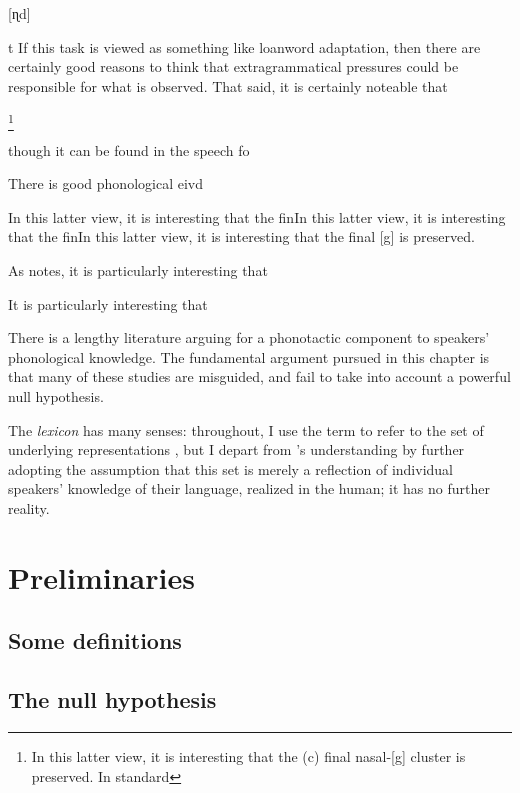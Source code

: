 
[ɳd]

t
If this task is viewed as something like loanword adaptation, then there are certainly good reasons to think that extragrammatical pressures \citep{Halle1998b,Dupoux1999,Ussishkin2003,Peperkamp2008} could be responsible for what is observed. That said, it is certainly noteable that 

\footnote{In this latter view, it is interesting that the (\lastx c) final nasal-[g] cluster is preserved. In standard }

\citep{Schleef2011}


though it can be found in the speech fo 

There is good phonological eivd

In this latter view, it is interesting that the finIn this latter view, it is interesting that the finIn this latter view, it is interesting that the final [g] is preserved.

As \citeauthor{Wright1975} notes, it is particularly interesting that 

It is particularly interesting that 


There is a lengthy literature arguing for a phonotactic component to speakers' phonological knowledge. The fundamental argument pursued in this chapter is that many of these studies are misguided, and fail to take into account a powerful null hypothesis.

The \emph{lexicon} has many senses: throughout, I use the term to refer to the set of underlying representations \citep[][269]{LANGUAGE}, but I depart from \citeauthor{LANGUAGE}'s understanding by further adopting the assumption that this set is merely a reflection of individual speakers' knowledge of their language, realized in the human; it has no further reality.

\section{Preliminaries}

\subsection{Some definitions}

\subsection{The null hypothesis}


